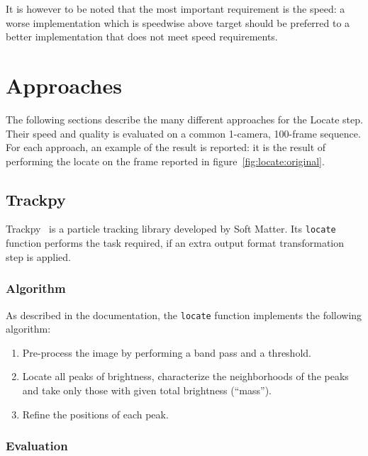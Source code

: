 It is however to be noted that the most important requirement is the speed: a worse implementation which is speedwise above target should be preferred to a better implementation that does not meet speed requirements.

\section{Approaches}

The following sections describe the many different approaches for the Locate step.
Their speed and quality is evaluated on a common 1-camera, 100-frame sequence.
For each approach, an example of the result is reported: it is the result of performing the locate on the frame reported in figure~\ref{fig:locate:original}.

\subsection{Trackpy}

Trackpy~\cite{trackpy} is a particle tracking library developed by Soft Matter.
Its \texttt{locate} function performs the task required, if an extra output format transformation step is applied.

\subsubsection{Algorithm}

As described in the documentation, the \texttt{locate} function implements the following algorithm:
\begin{enumerate}
	\itemsep 0em
	\item Pre-process the image by performing a band pass and a threshold.
	\item Locate all peaks of brightness, characterize the neighborhoods of the peaks and take only those with given total brightness (``mass'').
	\item Refine the positions of each peak.
\end{enumerate}

\subsubsection{Evaluation}

